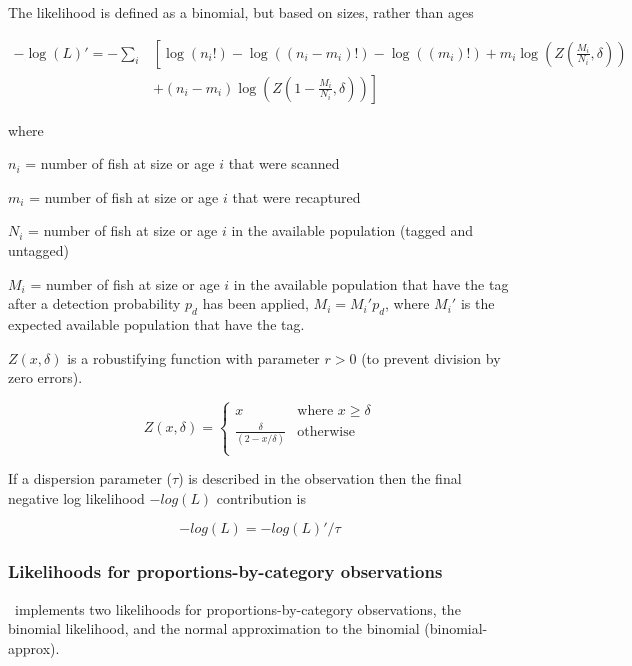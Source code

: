 The likelihood is defined as a binomial, but based on sizes, rather than ages

\begin{equation}
\begin{split}
-\log \left(L \right)'= -\sum\limits_i & \left[ \right. \log \left(n_i! \right) - \log \left(\left(n_i - m_i \right)! \right) - \log \left(\left(m_i \right)! \right) + m_i \log \left(Z\left(\frac{M_i}{N_i},\delta \right) \right) \\
&+  \left(n_i - m_i \right)\log \left(Z\left(1 - \frac{M_i}{N_i},\delta\right) \right) \left. \right]
\end{split}
\end{equation}

where

$n_i$ = number of fish at size or age $i$ that were scanned

$m_i$ = number of fish at size or age $i$ that were recaptured

$N_i$ = number of fish at size or age $i$ in the available population (tagged and untagged)

$M_i$ = number of fish at size or age $i$ in the available population that have the tag after a detection probability $p_d$ has been applied, $M_i = M_i'p_d$, where $M_i'$ is the expected available population that have the tag.

$Z(x,\delta)$ is a robustifying function with parameter $r > 0$ (to prevent division by zero errors).

\[ Z(x,\delta) =
\begin{cases}
x       & \text{where } x \geq \delta\\
\frac{\delta}{(2 - x / \delta)}  & \text{otherwise}\\
\end{cases}
\]

If a dispersion parameter ($\tau$) is described in the observation then the final negative log likelihood $-log(L)$ contribution is

$$-log(L) = -log(L)' / \tau$$

\subsubsection{Likelihoods for proportions-by-category observations}

\CNAME\ implements two likelihoods for proportions-by-category observations, the binomial likelihood, and the normal approximation to the binomial (binomial-approx).

